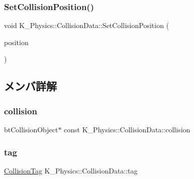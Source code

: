 \subsubsection{\texorpdfstring{Set\+Collision\+Position()}{SetCollisionPosition()}}
{\footnotesize\ttfamily void K\+\_\+\+Physics\+::\+Collision\+Data\+::\+Set\+Collision\+Position (\begin{DoxyParamCaption}\item[{const bt\+Vector3 \&}]{position }\end{DoxyParamCaption})}



\subsection{メンバ詳解}
\mbox{\label{class_k___physics_1_1_collision_data_a45dc4d1f2a85cef93993b2872c49fc49}} 
\subsubsection{\texorpdfstring{collision}{collision}}
{\footnotesize\ttfamily bt\+Collision\+Object$\ast$ const K\+\_\+\+Physics\+::\+Collision\+Data\+::collision}

\mbox{\label{class_k___physics_1_1_collision_data_aca2f02c2b5deed664630c0a04c4f2b1f}} 
\subsubsection{\texorpdfstring{tag}{tag}}
{\footnotesize\ttfamily \mbox{\hyperlink{struct_k___physics_1_1_collision_tag}{Collision\+Tag}} K\+\_\+\+Physics\+::\+Collision\+Data\+::tag}

